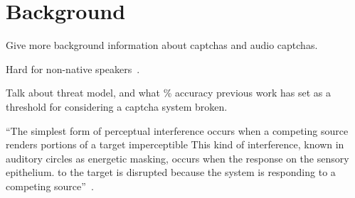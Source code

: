 \section{Background}
\label{sec:background}

Give more background information about captchas and audio captchas.

Hard for non-native speakers~\cite{yan2008usability}.

Talk about threat model, and what \% accuracy previous work has
set as a threshold for considering a captcha system broken.

``The simplest form of perceptual interference occurs when a competing source renders portions of a target imperceptible
This kind of interference, known in auditory circles as energetic masking, occurs when the response on the sensory epithelium.
to the target is disrupted because the system is responding to a competing source''~\cite{shinn2008object}.
